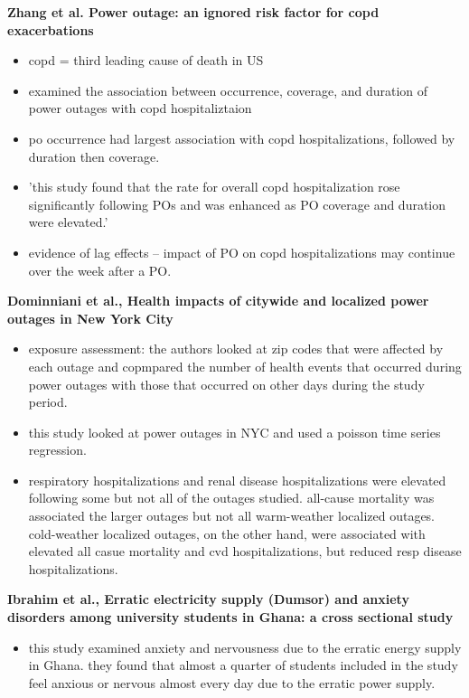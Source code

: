 \textbf{Zhang et al. Power outage: an ignored risk factor for copd exacerbations}
\begin{itemize}
    \item copd = third leading cause of death in US
    \item examined the association between occurrence, coverage, and duration of power outages with copd hospitaliztaion
    \item po occurrence had largest association with copd hospitalizations, followed by duration then coverage. 
    \item 'this study found that the rate for overall copd hospitalization rose significantly following POs and was enhanced as PO coverage and duration were elevated.'
    \item evidence of lag effects -- impact of PO on copd hospitalizations may continue over the week after a PO. 
\end{itemize}

\textbf{Dominniani et al., Health impacts of citywide and localized power outages in New York City}
\begin{itemize}
    \item exposure assessment: the authors looked at zip codes that were affected by each outage and copmpared the number of health events that occurred during power outages with those that occurred on other days during the study period. 
    \item this study looked at power outages in NYC and used a poisson time series regression. 
    \item respiratory hospitalizations and renal disease hospitalizations were elevated following some but not all of the outages studied. all-cause mortality was associated the larger outages but not all warm-weather localized outages. cold-weather localized outages, on the other hand, were associated with elevated all casue mortality and cvd hospitalizations, but reduced resp disease hospitalizations.
\end{itemize}


\textbf{Ibrahim et al., Erratic electricity supply (Dumsor) and anxiety disorders among university students in Ghana: a cross sectional study} 
\begin{itemize}
    \item this study examined anxiety and nervousness due to the erratic energy supply in Ghana. they found that almost a quarter of students included in the study feel anxious or nervous almost every day due to the erratic power supply.
\end{itemize}

